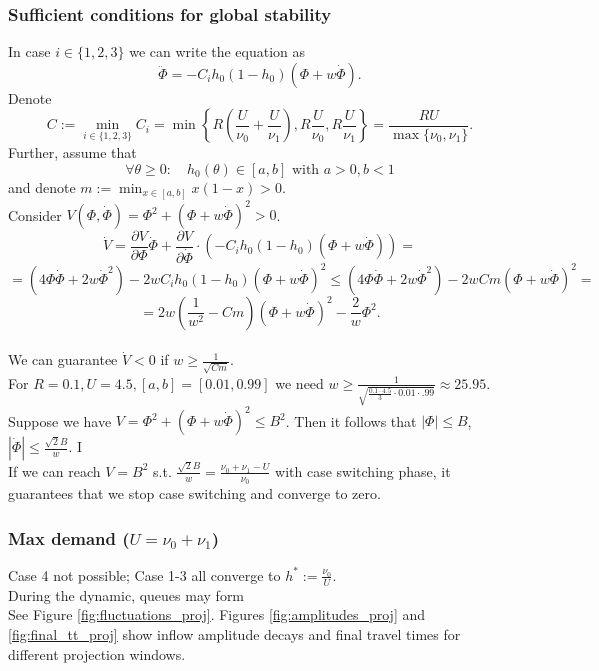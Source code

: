 \documentclass[12pt]{article}
\begin{document}
\subsubsection*{Sufficient conditions for global stability}
In case $i \in \{ 1, 2, 3 \}$ we can write the equation as
$$ \ddot{\Phi} = - C_i h_0(1-h_0)(\Phi + w \dot{\Phi}).$$ 
Denote 
$$ C := \min_{i \in \{ 1, 2, 3 \}} C_i = \min \left\{ R \left( \frac{U}{\nu_0} + \frac{U}{\nu_1} \right) , R \frac{U}{\nu_0} , R \frac{U}{\nu_1} \right\} = \frac{R U}{\max \{ \nu_0, \nu_1 \}}.$$
Further, assume that
 $$ \forall \theta \geq 0: \quad h_0(\theta) \in [a, b] \text{ with } a > 0, b < 1$$
  and denote  $m := \min_{x \in [a,b]} x(1-x) > 0 $.
\\
Consider $V(\Phi, \dot{\Phi}) = \Phi^2 + (\Phi + w \dot{\Phi}) ^2 >0 $.
$$ \dot{V} = \frac{\partial V}{\partial \Phi} \dot{\Phi} + \frac{\partial V}{\partial \dot{\Phi}} \cdot \left( -C_i  h_0(1-h_0)(\Phi + w \dot{\Phi}) \right)  = $$
$$ = \left( 4\Phi\dot{\Phi} + 2w\dot{\Phi}^2 \right) - 2w C_i h_0(1-h_0)(\Phi + w \dot{\Phi})^2 \leq \left(  4\Phi\dot{\Phi} + 2w\dot{\Phi}^2 \right) - 2wCm (\Phi + w \dot{\Phi})^2 = $$
$$ = 2w \left( \frac{1}{w^2} - Cm \right)  (\Phi + w \dot{\Phi})^2 - \frac{2}{w} \Phi^2  .$$
\\
We can guarantee $\dot{V} < 0$ if $w \geq \frac{1}{\sqrt{Cm}}$.
\\
For $R = 0.1, U = 4.5, [a,b] = [0.01, 0.99]$ we need $w \geq \frac{1}{\sqrt{ \frac{0.1 \cdot 4.5}{3} \cdot 0.01 \cdot .99}} \approx 25.95 $.
\\
Suppose we have $V = \Phi^2 + (\Phi + w\dot{\Phi})^2 \leq B^2$. Then it follows that $ |\Phi| \leq B $, $ | \dot{\Phi} | \leq \frac{\sqrt{2}B}{w} $. I
\\
If we can reach $V = B^2$ s.t. $\frac{\sqrt{2}B}{w} = \frac{\nu_0 + \nu_1 - U}{\nu_0} $ with case switching phase, it guarantees that  we stop case switching and converge to zero.

\newpage

\subsubsection*{Max demand ($U = \nu_0 + \nu_1$)}


Case 4 not possible; Case 1-3 all converge to $h^* := \frac{\nu_0}{U}$.
\\
During the dynamic, queues may form
\\
See Figure \ref{fig:fluctuations_proj}. Figures \ref{fig:amplitudes_proj} and \ref{fig:final_tt_proj} show inflow amplitude decays and final travel times for different projection windows.
\end{document}
